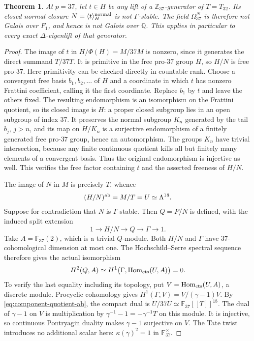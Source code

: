 \documentclass[11pt]{article}
\newtheorem{theorem}{Theorem}[section]
\theoremstyle{definition}\newtheorem{definition}[theorem]{Definition}
\begin{document}
\begin{theorem}\label{thm:component-no-galois-p37}
At $p=37$, let $t\in H$ be any lift of a
$\mathbb Z_{37}$-generator of $T=T_{32}$.  Its closed normal
closure $N=\langle t\rangle_H^{\rm normal}$ is not
$\Gamma$-stable.  The field $\Omega_{37}^N$ is therefore not
Galois over $F_1$, and hence is not Galois over $\mathbb Q$.
This applies in particular to every exact $\Delta$-eigenlift of
that generator.
\end{theorem}

\begin{proof}
The image of $t$ in $H/\Phi(H)=M/37M$ is nonzero, since it
generates the direct summand $T/37T$.  It is primitive in the free
pro-$37$ group $H$, so $H/N$ is free pro-$37$.
Here primitivity can be checked directly in countable rank.
Choose a convergent free basis $b_1,b_2,\ldots$ of $H$ and a
coordinate in which $t$ has nonzero Frattini coefficient, calling
it the first coordinate.  Replace $b_1$ by $t$ and leave the
others fixed.  The resulting endomorphism is an isomorphism on
the Frattini quotient, so its closed image is $H$: a proper
closed subgroup lies in an open subgroup of index $37$.
It preserves the normal subgroup $K_n$ generated by the tail
$b_j$, $j>n$, and its map on $H/K_n$ is a surjective
endomorphism of a finitely generated free pro-$37$ group, hence
an automorphism.  The groups $K_n$ have trivial intersection,
because any finite continuous quotient kills all but finitely
many elements of a convergent basis.  Thus the original
endomorphism is injective as well.  This verifies the free
factor containing $t$ and the asserted freeness of $H/N$.

The image of $N$ in $M$ is precisely $T$, whence
\begin{equation}\label{eq:component-quotient-ab}
 (H/N)^{\rm ab}=M/T=U\simeq\Lambda^{18}.
\end{equation}
Suppose for contradiction that $N$ is $\Gamma$-stable.  Then
$Q=P/N$ is defined, with the induced split extension
\[
 1\longrightarrow H/N\longrightarrow Q\longrightarrow\Gamma
 \longrightarrow1.
\]
Take $A=\mathbb F_{37}(2)$, which is a trivial $Q$-module.
Both $H/N$ and $\Gamma$ have $37$-cohomological dimension at
most one.  The Hochschild--Serre spectral sequence therefore
gives the actual isomorphism
\begin{equation}\label{eq:component-h2-zero}
 H^2(Q,A)\simeq
 H^1\bigl(\Gamma,\operatorname{Hom}_{\rm cts}(U,A)\bigr)=0.
\end{equation}
To verify the last equality including its topology, put
$V=\operatorname{Hom}_{\rm cts}(U,A)$, a discrete module.
Procyclic cohomology gives $H^1(\Gamma,V)=V/(\gamma-1)V$.
By \eqref{eq:component-quotient-ab}, the compact dual is
$U/37U\simeq\mathbb F_{37}[[T]]^{18}$.
The dual of $\gamma-1$ on $V$ is multiplication by
$\gamma^{-1}-1=-\gamma^{-1}T$ on this module.  It is injective,
so continuous Pontryagin duality makes $\gamma-1$ surjective
on $V$.  The Tate twist introduces no additional scalar here:
$\kappa(\gamma)^2=1$ in $\mathbb F_{37}^{\times}$.


\end{proof}
\end{document}

